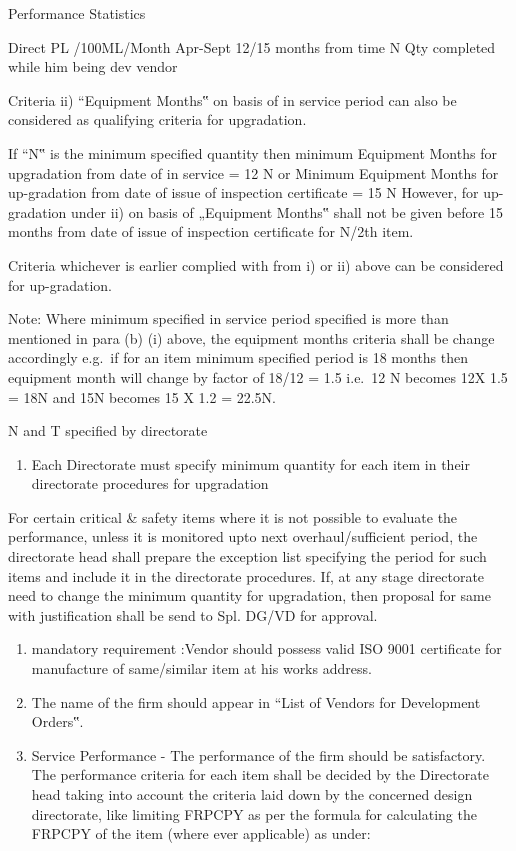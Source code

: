 \documentclass[
  ignorenonframetext,
]{beamer}
\providecommand{\tightlist}{%
  \setlength{\itemsep}{0pt}\setlength{\parskip}{0pt}}
\begin{document}
\begin{frame}{Performance Statistics}
\begin{block}{Direct PL /100ML/Month Apr-Sept}
12/15 months from time N Qty completed while him being dev vendor

Criteria ii) ``Equipment Months‟ on basis of in service period can also
be considered as qualifying criteria for upgradation.

If ``N‟ is the minimum specified quantity then minimum Equipment Months
for upgradation from date of in service = 12 N or Minimum Equipment
Months for up-gradation from date of issue of inspection certificate =
15 N However, for up-gradation under ii) on basis of „Equipment Months‟
shall not be given before 15 months from date of issue of inspection
certificate for N/2th item.

Criteria whichever is earlier complied with from i) or ii) above can be
considered for up-gradation.

Note: Where minimum specified in service period specified is more than
mentioned in para (b) (i) above, the equipment months criteria shall be
change accordingly e.g.~if for an item minimum specified period is 18
months then equipment month will change by factor of 18/12 = 1.5 i.e.~12
N becomes 12X 1.5 = 18N and 15N becomes 15 X 1.2 = 22.5N.

N and T specified by directorate

\begin{enumerate}[<+->]
[a)]
\setcounter{enumi}{2}
\tightlist
\item
  Each Directorate must specify minimum quantity for each item in their
  directorate procedures for upgradation
\end{enumerate}

For certain critical \& safety items where it is not possible to
evaluate the performance, unless it is monitored upto next
overhaul/sufficient period, the directorate head shall prepare the
exception list specifying the period for such items and include it in
the directorate procedures. If, at any stage directorate need to change
the minimum quantity for upgradation, then proposal for same with
justification shall be send to Spl. DG/VD for approval.

\begin{enumerate}[<+->]
[a)]
\setcounter{enumi}{3}
\item
  mandatory requirement :Vendor should possess valid ISO 9001
  certificate for manufacture of same/similar item at his works address.
\item
  The name of the firm should appear in ``List of Vendors for
  Development Orders‟.
\item
  Service Performance - The performance of the firm should be
  satisfactory. The performance criteria for each item shall be decided
  by the Directorate head taking into account the criteria laid down by
  the concerned design directorate, like limiting FRPCPY as per the
  formula for calculating the FRPCPY of the item (where ever applicable)
  as under:
\end{enumerate}


\end{block}
\end{frame}
\end{document}
